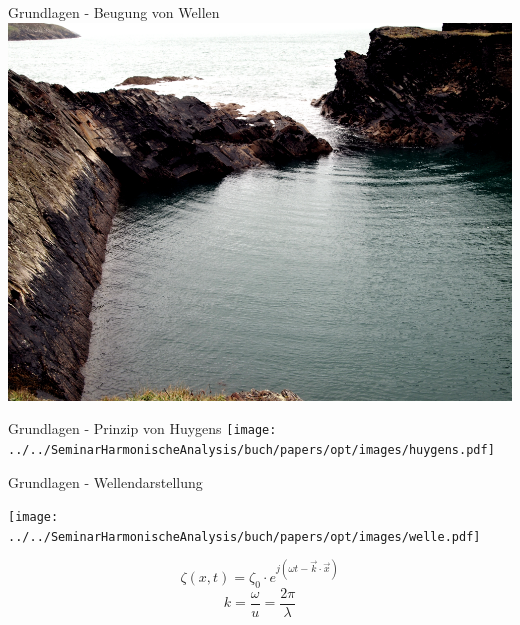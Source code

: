 \documentclass{beamer}
\begin{document}
\begin{frame}{Grundlagen - Beugung von Wellen}
    \centering
    \includegraphics[width=0.9\linewidth]{images/beugung_von_wasserwellen.png}
\end{frame}

\begin{frame}{Grundlagen - Prinzip von Huygens}
    \texttt{[image: ../../SeminarHarmonischeAnalysis/buch/papers/opt/images/huygens.pdf]}
\end{frame}

\begin{frame}{Grundlagen - Wellendarstellung}
    \begin{center}
        \texttt{[image: ../../SeminarHarmonischeAnalysis/buch/papers/opt/images/welle.pdf]}
    \end{center}
    \begin{equation*}
        \zeta(x, t)
        =
        \zeta_0 \cdot e^{j(\omega t - \vec{k}\cdot\vec{x})}
    \end{equation*}
    \begin{equation*}
        k
        =
        \frac{\omega}{u}
        =
        \frac{2 \pi}{\lambda}
    \end{equation*}
\end{frame}
\end{document}
